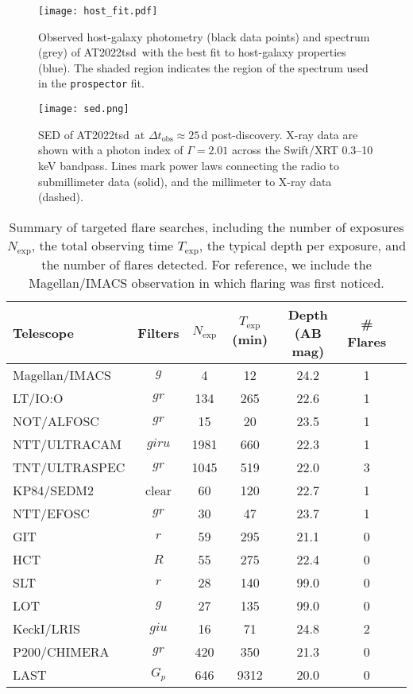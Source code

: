 \documentclass{nature_plusfigure}
\newcommand{\at}{AT2022tsd}
\begin{document}
\begin{extended_data}
\begin{figure}[!ht]
 \centering
\texttt{[image: host\_fit.pdf]}
  \caption{Observed host-galaxy photometry (black data points) and spectrum (grey) of \at\, with the best fit to host-galaxy properties (blue). The shaded region indicates the region of the spectrum used in the \texttt{prospector} fit.
}
 \label{fig:host-fit}
\end{figure}

\begin{figure}[!ht]
 \centering
\texttt{[image: sed.png]}
  \caption{SED of \at\ at $\Delta t_\mathrm{obs}\approx25\,$d post-discovery. X-ray data are shown with a photon index of $\Gamma=2.01$ across the Swift/XRT 0.3--10\,keV bandpass. Lines mark power laws connecting the radio to submillimeter data (solid), and the millimeter to X-ray data (dashed).}
 \label{fig:full-sed}
\end{figure}

\begin{table}
\begin{center}
\caption{Summary of targeted flare searches, including the number of exposures $N_\mathrm{exp}$, the total observing time $T_\mathrm{exp}$, the typical depth per exposure, and the number of flares detected. For reference, we include the Magellan/IMACS observation in which flaring was first noticed.}
\label{tab:flare-searches}
\begin{tabular}{lcccccc} 
\hline\hline
Telescope & Filters & $N_\mathrm{exp}$ & $T_\mathrm{exp}$ (min) & Depth (AB mag) & \# Flares \\
\hline
Magellan/IMACS & $g$ & 4 & 12 & 24.2 & 1 \\
LT/IO:O & $gr$ & 134 & 265 & 22.6 & 1 \\
NOT/ALFOSC & $gr$ & 15 & 20 & 23.5 & 1 \\
NTT/ULTRACAM & $giru$ & 1981 & 660 & 22.3 & 1 \\
TNT/ULTRASPEC & $gr$ & 1045 & 519 & 22.0 & 3 \\
KP84/SEDM2 & clear & 60 & 120 & 22.7 & 1 \\
NTT/EFOSC & $gr$ & 30 & 47 & 23.7 & 1 \\
GIT & $r$ & 59 & 295 & 21.1 & 0 \\
HCT & $R$ & 55 & 275 & 22.4 & 0 \\
SLT & $r$ & 28 & 140 & 99.0 & 0 \\
LOT & $g$ & 27 & 135 & 99.0 & 0 \\
KeckI/LRIS & $giu$ & 16 & 71 & 24.8 & 2 \\
P200/CHIMERA & $gr$ & 420 & 350 & 21.3 & 0 \\
LAST & $G_p$ & 646 & 9312 & 20.0 & 0 \\
\hline
\end{tabular}
\end{center}
\end{table}


\end{extended_data}
\end{document}
